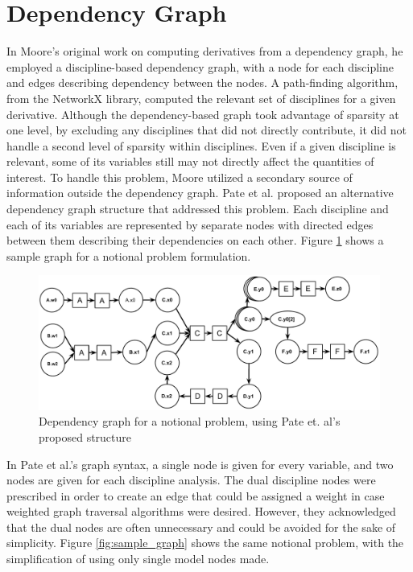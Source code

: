 \documentclass[]{aiaa-tc} %
\begin{document}
  \section{Dependency Graph}\label{section:depgraph}

    In Moore's original work on computing derivatives from a dependency graph, he employed
    a discipline-based dependency graph, with a node for each discipline and edges describing
    dependency between the nodes. A path-finding algorithm, from the NetworkX library\cite{hagberg-2008-exploring},
    computed the relevant set of disciplines for a given derivative. Although the dependency-based graph took advantage of sparsity at
    one level, by excluding any disciplines that did not directly contribute, it did not handle a second level of sparsity
    within disciplines. Even if a given discipline is relevant, some of its variables still may not
    directly affect the quantities of interest. To handle this problem, Moore utilized a secondary source of information
    outside the dependency graph. Pate et al. proposed an alternative dependency graph
    structure that addressed this problem\cite{graph_problem2013}. Each discipline and each of its variables are
    represented by separate nodes with directed edges between them describing their dependencies on each other.
    Figure \ref{fig:sample_graph_full} shows a sample graph for a notional problem formulation. 

    \begin{figure}[!htb]\begin{center}
      \includegraphics[width=.8\textwidth]{images/sample_graph_full}
      \caption{ Dependency graph for a notional problem, using Pate et. al's proposed structure\label{fig:sample_graph_full}}
    \end{center}\end{figure}

    In Pate et al.'s graph syntax, a single node is given for every variable, and two nodes are given
    for each discipline analysis. The dual discipline nodes were prescribed in order to create an edge
    that could be assigned a weight in case weighted graph traversal algorithms were desired. However,
    they acknowledged that the dual nodes are often unnecessary and could be avoided for the sake of simplicity.
    Figure \ref{fig:sample_graph} shows the same notional problem, with the simplification of using only single 
    model nodes made. 
\end{document}
